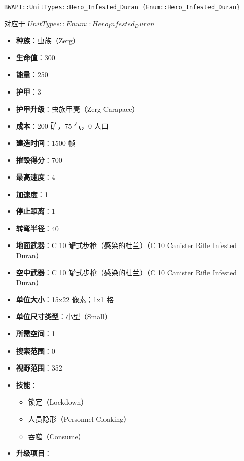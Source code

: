 \begin{tcolorbox}[colback=white, colframe=black!60!white, title=Hero\_Infested\_Duran(), arc=0mm]
    \begin{verbatim}
BWAPI::UnitTypes::Hero_Infested_Duran {Enum::Hero_Infested_Duran}
    \end{verbatim}
    对应于  $ UnitTypes::Enum::Hero_Infested_Duran $ 
    \begin{itemize}
        \item \textbf{种族}：虫族（Zerg）
        \item \textbf{生命值}：300
        \item \textbf{能量}：250
        \item \textbf{护甲}：3
        \item \textbf{护甲升级}：虫族甲壳（Zerg Carapace）
        \item \textbf{成本}：200 矿，75 气，0 人口
        \item \textbf{建造时间}：1500 帧
        \item \textbf{摧毁得分}：700
        \item \textbf{最高速度}：4
        \item \textbf{加速度}：1
        \item \textbf{停止距离}：1
        \item \textbf{转弯半径}：40
        \item \textbf{地面武器}：C 10 罐式步枪（感染的杜兰）（C 10 Canister Rifle Infested Duran）
        \item \textbf{空中武器}：C 10 罐式步枪（感染的杜兰）（C 10 Canister Rifle Infested Duran）
        \item \textbf{单位大小}：15x22 像素；1x1 格
        \item \textbf{单位尺寸类型}：小型（Small）
        \item \textbf{所需空间}：1
        \item \textbf{搜索范围}：0
        \item \textbf{视野范围}：352
        \item \textbf{技能}：
            \begin{itemize}
                \item 锁定（Lockdown）
                \item 人员隐形（Personnel Cloaking）
                \item 吞噬（Consume）
            \end{itemize}
        \item \textbf{升级项目}：

\end{itemize}
\end{tcolorbox}
